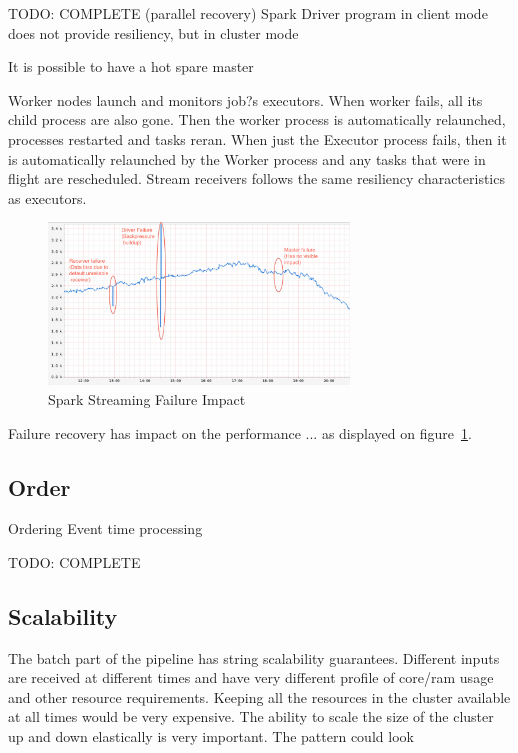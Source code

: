 \documentclass[a4paper, 10 pt, conference]{IEEEtran}
\begin{document}
TODO: COMPLETE (parallel recovery)
Spark Driver program in client mode does not provide resiliency, but in cluster mode 

It is possible to have a hot spare master 

Worker nodes launch and monitors job?s executors. When worker fails, all its child process are also gone. Then the worker process is automatically relaunched, processes restarted and tasks reran. When just the Executor process fails, then it is automatically relaunched by the Worker process and any tasks that were in flight are rescheduled. Stream receivers follows the same resiliency characteristics as 
executors.

\begin{figure}[hb]
	\begin{center}
		\caption{Spark Streaming Failure Impact}
		\label{fig:sparkStreamingFailureImpact}
		\includegraphics[width=8cm,keepaspectratio]{spark-streaming-failure-impact.png}
	\end{center}
\end{figure}

Failure recovery has impact on the performance ... as displayed on figure~\ref{fig:sparkStreamingFailureImpact}.

\subsection{Order}
Ordering
Event time processing

TODO: COMPLETE

\subsection{Scalability}
The batch part of the pipeline has string scalability guarantees. Different inputs are received at different times and have very different profile of core/ram usage and other resource requirements. Keeping all the resources in the cluster available at all times would be very expensive. The ability to scale the size of the cluster up and down elastically is very important. The pattern could look 
\end{document}
